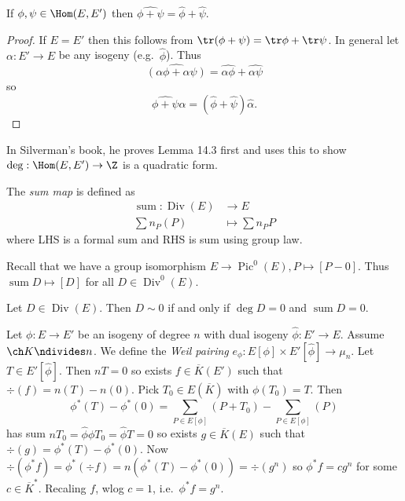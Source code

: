 \documentclass[a4paper]{article}
\theoremstyle{definition}
\DeclareMathOperator{\Div}{Div} %
\DeclareMathOperator{\Pic}{Pic} %
\DeclareMathOperator{\Sum}{sum} %
\begin{document}
\begin{lemma}
  If \(\phi, \psi \in \Hom(E, E')\) then \(\widehat{\phi + \psi} = \hat \phi + \hat \psi\).
\end{lemma}

\begin{proof}
  If \(E = E'\) then this follows from \(\tr(\phi + \psi) = \tr \phi + \tr \psi\). In general let \(\alpha: E' \to E\) be any isogeny (e.g.\ \(\hat \phi\)). Thus
  \[
    \widehat{(\alpha \phi + \alpha \psi)} = \widehat{\alpha \phi} + \hat{\alpha \psi}
  \]
  so
  \[
    \widehat{\phi + \psi} \hat \alpha = (\hat \phi + \hat \psi) \hat \alpha.
  \]
\end{proof}

\begin{remark}
  In Silverman's book, he proves Lemma 14.3 first and uses this to show \(\deg: \Hom(E, E') \to \Z\) is a quadratic form.
\end{remark}

\begin{definition}[sum]
  The \emph{sum map} is defined as
  \begin{align*}
    \Sum: \Div(E) &\to E \\
    \sum n_P(P) &\mapsto \sum n_P P
  \end{align*}
  where LHS is a formal sum and RHS is sum using group law.
\end{definition}

Recall that we have a group isomorphism \(E \to \Pic^0(E), P \mapsto [P - 0]\). Thus \(\Sum D \mapsto [D]\) for all \(D \in \Div^0(E)\).

\begin{lemma}
  Let \(D \in \Div(E)\). Then \(D \sim 0\) if and only if \(\deg D = 0\) and \(\Sum D = 0\).
\end{lemma}

Let \(\phi: E \to E'\) be an isogeny of degree \(n\) with dual isogeny \(\hat \phi: E' \to E\). Assume \(\ch K \ndivides n\). We define the \emph{Weil pairing} \(e_\phi: E[\phi] \times E'[\hat \phi] \to \mu_n\). Let \(T \in E'[\hat \phi]\). Then \(nT = 0\) so exists \(f \in \overline K(E')\) such that \(\div(f) = n(T) - n(0)\). Pick \(T_0 \in E(\overline K)\) with \(\phi(T_0) = T\). Then
\[
  \phi^*(T) - \phi^*(0) = \sum_{P \in E[\phi]} (P + T_0) - \sum_{P \in E[\phi]}(P)
\]
has sum \(nT_0 = \hat \phi \phi T_0 = \hat \phi T = 0\) so exists \(g \in \overline K(E)\) such that \(\div(g) = \phi^*(T) - \phi^*(0)\). Now \(\div(\phi^*f) = \phi^*(\div f) = n(\phi^*(T) - \phi^*(0)) = \div (g^n)\) so \(\phi^* f = c g^n\) for some \(c \in \overline K^*\). Recaling \(f\), wlog \(c = 1\), i.e.\ \(\phi^*f = g^n\).
\end{document}
